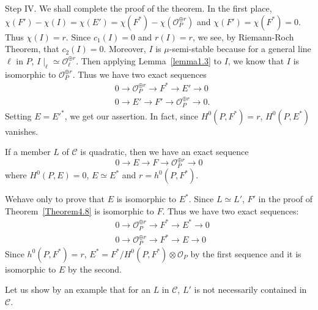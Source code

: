 \begin{Proof}
Step IV. We shall complete the proof of the theorem. In the first
place,
$\chi (F')-\chi (I)=\chi (E')=\chi (F^{\ast})-\chi (\mathscr{O}_{P}^{\oplus
  r})$ and $\chi (F')=\chi (F^{\ast})=0$. Thus
$\chi (I)=r$. Since $c_1(I)=0$ and $r(I)=r$, we see, by
Riemann-Roch Theorem, that $c_2(I)=0$. Moreover, $I$ is
$\mu$-semi-stable because for a general line $\ell$ in $P$,
$I\mid_{\ell}\simeq \mathscr{O}_{\ell}^{\oplus r}$. Then applying
Lemma~\ref{lemma1.3} to $I$, we know that $I$ is isomorphic to
$\mathscr{O}^{\oplus r}_{P}$. Thus we have two exact sequences
\begin{align*}
&0\to \mathscr{O}_P^{\oplus r}\to F^{\ast}\to E'\to 0\\
&0\to E'\to F'\to \mathscr{O}^{\oplus r}_{P}\to 0.
\end{align*}
Setting $E={E'}^{\ast}$, we get our assertion. In fact, since
$H^{0}(P,F^{\ast})=r$, $H^{0}(P,E^{\ast})$ vanishes.
\enprf
\end{Proof}

\setcounter{cor}{6}
\begin{cor}\label{cor4.8.7}
If a member $L$ of $\mathscr{C}$ is quadratic, then we have an exact
sequence 
$$
0\to E\to F\to \mathscr{O}_P^{\oplus r}\to 0
$$ 
where $H^{0}(P,E)=0$, $E\simeq E^{\ast}$ and $r=h^{0}(P,F^{\ast})$.
\end{cor}

\begin{Proof}
We\pageoriginale have only to prove that $E$ is isomorphic to
$E^{\ast}$. Since $L\simeq L'$, $F'$ in the proof of
Theorem~\ref{Theorem4.8} is isomorphic to $F$. 
Thus we have two exact sequences:
\begin{align*}
&0\to \mathscr{O}_P^{\oplus r}\to F^{\ast}\to E^{\ast}\to 0\\
&0\to \mathscr{O}^{\oplus r}_{P}\to F^{\ast}\to E\to 0
\end{align*}
Since $h^{0}(P,F^{\ast})=r$,
$E^{\ast}=F^{\ast}/H^{0}(P,F^{\ast})\otimes \mathscr{O}_P$ by 
the first sequence and it is isomorphic to $E$ by the second.
\enprf
\end{Proof}

Let us show by an example that for an $L$ in $\mathscr{C}$, $L'$ is not
necessarily contained in $\mathscr{C}$. 

